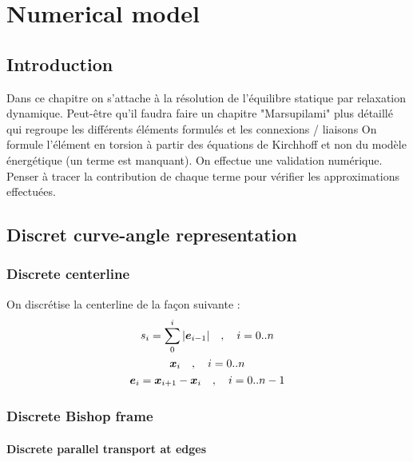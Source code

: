 \chapter{Numerical model}

\section{Introduction}
Dans ce chapitre on s'attache à la résolution de l'équilibre statique par relaxation dynamique.
Peut-être qu'il faudra faire un chapitre "Marsupilami" plus détaillé qui regroupe les différents éléments formulés et les connexions / liaisons
On formule l'élément en torsion à partir des équations de Kirchhoff et non du modèle énergétique (un terme est manquant).
On effectue une validation numérique. Penser à tracer la contribution de chaque terme pour vérifier les approximations effectuées.

\cite{Dill1992}


\section{Discret curve-angle representation}

\subsection{Discrete centerline}
On discrétise la centerline de la façon suivante :
\begin{subequations}
	\begin{gather}
		s_i = \sum\limits_0^i |\boldsymbol{e}_{i-1}|  \quad , \quad i=0..n \\
		\boldsymbol{x}_i \quad , \quad i=0..n \\
		\boldsymbol{e}_i = \boldsymbol{x}_{i+1}-\boldsymbol{x}_i \quad , \quad i=0..n-1
	\end{gather}
\end{subequations}

\subsection{Discrete Bishop frame}

\subsubsection{Discrete parallel transport at edges}

